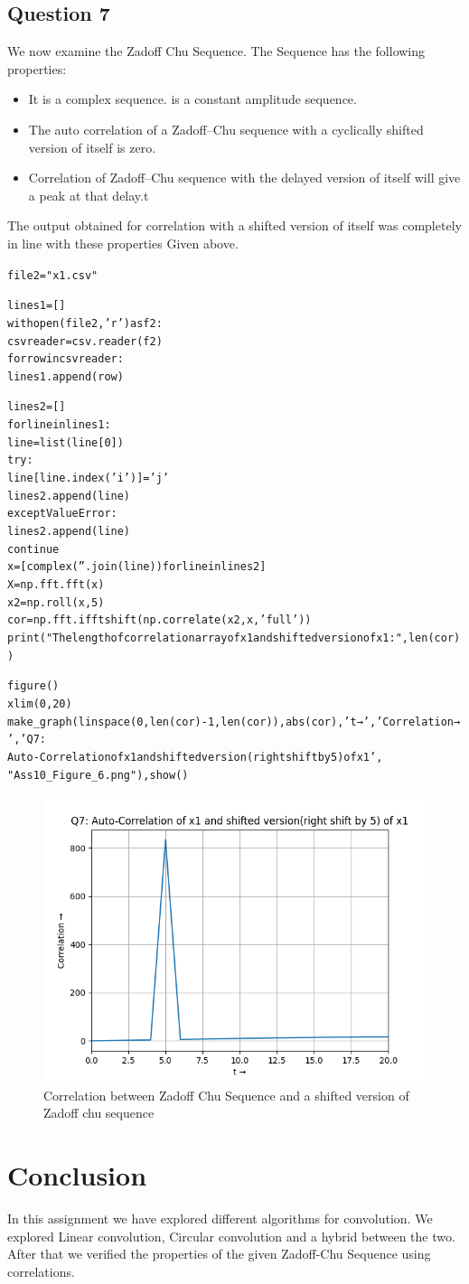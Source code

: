 \documentclass{article}
\begin{document}
\subsection{Question 7}
We now examine the Zadoff Chu Sequence. The Sequence has the following properties:

\begin{itemize}
\item It is a complex sequence.
\itemIt is a constant amplitude sequence.
\item The auto correlation of a Zadoff–Chu sequence with a cyclically shifted version of itself is zero.
\item Correlation of Zadoff–Chu sequence with the delayed version of itself will give a peak at that delay.t
\end{itemize}
The output obtained for correlation with a shifted version of itself was completely in line with these properties Given above.
\begin{alltt}
file2 = "x1.csv"

lines1 = []
with open(file2, 'r') as f2:
    csvreader = csv.reader(f2)
    for row in csvreader:
        lines1.append(row)

lines2 = []
for line in lines1:
    line = list(line[0])
    try :
        line[line.index('i')] = 'j'
        lines2.append(line)
    except ValueError:
        lines2.append(line)
        continue
x = [complex(''.join(line)) for line in lines2]
X = np.fft.fft(x)
x2 = np.roll(x, 5)
cor = np.fft.ifftshift(np.correlate(x2, x, 'full'))
print("The length of correlation array of x1 and shifted version of x1: ", len(cor))

figure()
xlim(0, 20)
make_graph(linspace(0, len(cor) - 1, len(cor)), abs(cor), 't →', 'Correlation →', 'Q7:
Auto-Correlation of x1 and shifted version(right shift by 5) of x1', 
"Ass10_Figure_6.png"),show()
\end{alltt}

\begin{figure}[h!]
\centering
\includegraphics[scale=0.6]{Ass10_Figure_6.png}
\caption{Correlation between Zadoff Chu Sequence and a shifted version of Zadoff chu sequence}
\label{fig:universe}
\end{figure}

\newpage
\section{Conclusion}
In this assignment we have explored different algorithms for convolution. We explored Linear convolution, Circular convolution and a hybrid between the two. After that we verified the properties of the given Zadoff-Chu Sequence using correlations. 
\end{document}
